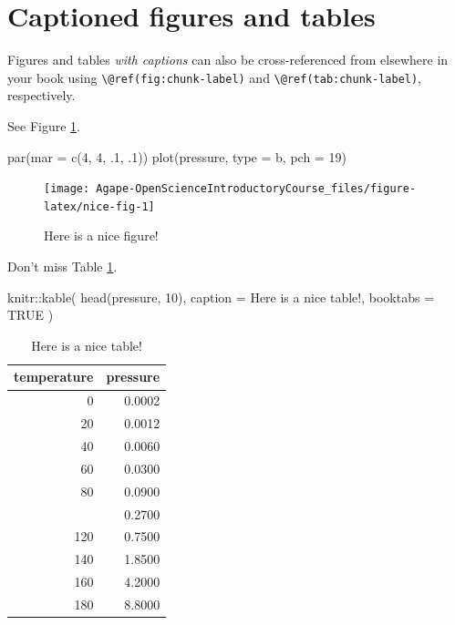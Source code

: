 \documentclass[
]{book}
\newenvironment{Shaded}{\begin{snugshade}}{\end{snugshade}}
\newcommand{\AttributeTok}[1]{\textcolor[rgb]{0.77,0.63,0.00}{#1}}
\newcommand{\ConstantTok}[1]{\textcolor[rgb]{0.00,0.00,0.00}{#1}}
\newcommand{\DecValTok}[1]{\textcolor[rgb]{0.00,0.00,0.81}{#1}}
\newcommand{\FunctionTok}[1]{\textcolor[rgb]{0.00,0.00,0.00}{#1}}
\newcommand{\NormalTok}[1]{#1}
\newcommand{\SpecialCharTok}[1]{\textcolor[rgb]{0.00,0.00,0.00}{#1}}
\newcommand{\StringTok}[1]{\textcolor[rgb]{0.31,0.60,0.02}{#1}}
\theoremstyle{definition}
\theoremstyle{definition}
\theoremstyle{definition}
\theoremstyle{definition}
\theoremstyle{remark}
\begin{document}
\hypertarget{captioned-figures-and-tables}{%
\section{Captioned figures and tables}\label{captioned-figures-and-tables}}

Figures and tables \emph{with captions} can also be cross-referenced from elsewhere in your book using \texttt{\textbackslash{}@ref(fig:chunk-label)} and \texttt{\textbackslash{}@ref(tab:chunk-label)}, respectively.

See Figure \ref{fig:nice-fig}.

\begin{Shaded}
\begin{Highlighting}[]
\FunctionTok{par}\NormalTok{(}\AttributeTok{mar =} \FunctionTok{c}\NormalTok{(}\DecValTok{4}\NormalTok{, }\DecValTok{4}\NormalTok{, .}\DecValTok{1}\NormalTok{, .}\DecValTok{1}\NormalTok{))}
\FunctionTok{plot}\NormalTok{(pressure, }\AttributeTok{type =} \StringTok{\textquotesingle{}b\textquotesingle{}}\NormalTok{, }\AttributeTok{pch =} \DecValTok{19}\NormalTok{)}
\end{Highlighting}
\end{Shaded}

\begin{figure}

{\centering \texttt{[image: Agape-OpenScienceIntroductoryCourse\_files/figure-latex/nice-fig-1]} 

}

\caption{Here is a nice figure!}\label{fig:nice-fig}
\end{figure}

Don't miss Table \ref{tab:nice-tab}.

\begin{Shaded}
\begin{Highlighting}[]
\NormalTok{knitr}\SpecialCharTok{::}\FunctionTok{kable}\NormalTok{(}
  \FunctionTok{head}\NormalTok{(pressure, }\DecValTok{10}\NormalTok{), }\AttributeTok{caption =} \StringTok{\textquotesingle{}Here is a nice table!\textquotesingle{}}\NormalTok{,}
  \AttributeTok{booktabs =} \ConstantTok{TRUE}
\NormalTok{)}
\end{Highlighting}
\end{Shaded}

\begin{table}

\caption{\label{tab:nice-tab}Here is a nice table!}
\centering
\begin{tabular}[t]{rr}
\toprule
temperature & pressure\\
\midrule
0 & 0.0002\\
20 & 0.0012\\
40 & 0.0060\\
60 & 0.0300\\
80 & 0.0900\\
\addlinespace
100 & 0.2700\\
120 & 0.7500\\
140 & 1.8500\\
160 & 4.2000\\
180 & 8.8000\\
\bottomrule
\end{tabular}
\end{table}
\end{document}
